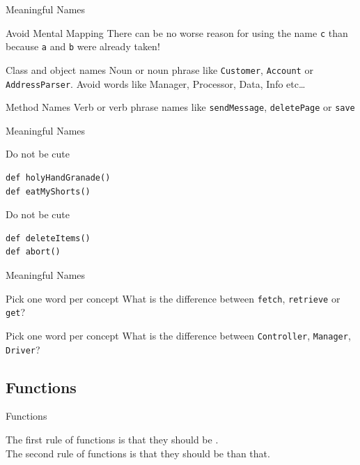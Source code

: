 \begin{frame}[fragile]{Meaningful Names}
\begin{alertblock}{Avoid Mental Mapping}
There can be no worse reason for using the name \lstinline!c! than because
\lstinline!a! and \lstinline!b! were already taken!
\end{alertblock}
\begin{block}{Class and object names}
Noun or noun phrase like \lstinline!Customer!, \lstinline!Account! or
\lstinline!AddressParser!. \alert{Avoid} words like \alert{Manager},
\alert{Processor}, \alert{Data}, \alert{Info} etc\ldots
\end{block}
\begin{block}{Method Names}
Verb or verb phrase names like \lstinline!sendMessage!, \lstinline!deletePage!
or \lstinline!save!
\end{block}
\end{frame}

\begin{frame}[fragile]{Meaningful Names}
\begin{alertblock}{Do not be cute}
\begin{lstlisting}
def holyHandGranade()
def eatMyShorts()
\end{lstlisting}
\end{alertblock}
\begin{exampleblock}{Do not be cute}
\begin{lstlisting}
def deleteItems()
def abort()
\end{lstlisting}
\end{exampleblock}
\end{frame}

\begin{frame}[fragile]{Meaningful Names}
\begin{alertblock}{Pick one word per concept}
What is the difference between \lstinline!fetch!, \lstinline!retrieve! or
\lstinline!get!?
\end{alertblock}
\begin{alertblock}{Pick one word per concept}
What is the difference between \lstinline!Controller!, \lstinline!Manager!,
\lstinline!Driver!?
\end{alertblock}
\end{frame}

\subsection{Functions}
\begin{frame}{Functions}
\begin{center}
The first rule of functions is that they should be .\\
The second rule of functions is that they should be  than
that.\\
\\
\\
\\
\end{center}
\end{frame}

